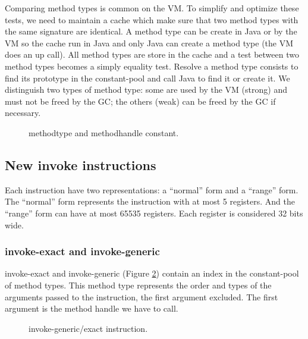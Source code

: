 \documentclass{sig-alternate}
\begin{document}
    Comparing method types is common on the VM.
    To simplify and optimize these tests, we need to maintain a cache which make sure that two method types with the same signature are identical.
    A method type can be create in Java or by the VM so the cache run in Java and only Java can create a method type (the VM does an up call).
    All method types are store in the cache and a test between two method types becomes a simply equality test.
    Resolve a method type consists to find its prototype in the constant-pool and call Java to find it or create it.
    We distinguish two types of method type: some are used by the VM (strong) and must not be freed by the GC; the others (weak) can be freed by the GC if necessary.

    \begin{figure}[!h]
      \centering \resizebox{.9\linewidth}{!}{}
      \caption{methodtype and methodhandle constant.}\vspace{-1em}
      \label{MTMHldc}
    \end{figure}

  \subsection{New invoke instructions}
    Each instruction have two representations: a ``normal'' form and a ``range'' form.
    The ``normal'' form represents the instruction with at most 5 registers.
    And the ``range'' form can have at most 65535 registers.
    Each register is considered 32 bits wide.

    \subsubsection{invoke-exact and invoke-generic}

      invoke-exact and invoke-generic (Figure \ref{INGEins}) contain an index in the constant-pool of method types.
      This method type represents the order and types of the arguments passed to the instruction, the first argument excluded.
      The first argument is the method handle we have to call.\\

      \begin{figure}[!h]
        \centering \resizebox{.9\linewidth}{!}{}
        \caption{invoke-generic/exact instruction.}\vspace{-1em}
        \label{INGEins}
      \end{figure}
\end{document}
